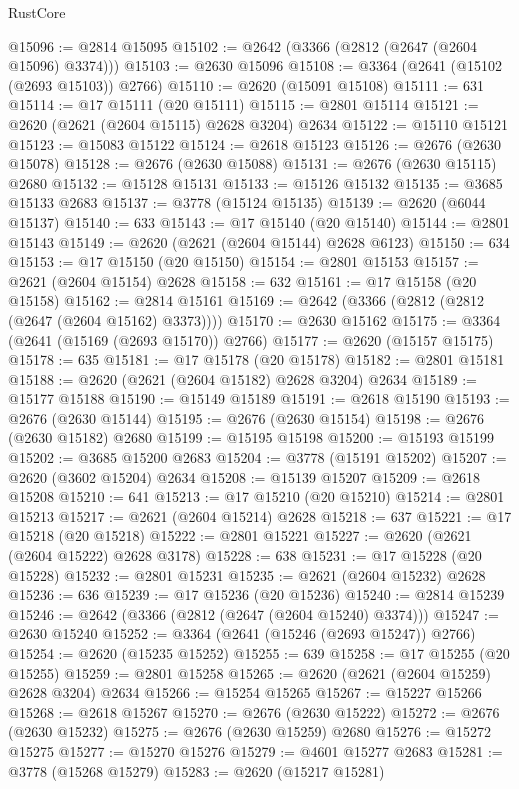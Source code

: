 \begin{lexlean}{RustCore}
\begin{coremodule}
@15096 := @2814 @15095
@15102 := @2642 (@3366 (@2812 (@2647 (@2604 @15096) @3374)))
@15103 := @2630 @15096
@15108 := @3364 (@2641 (@15102 (@2693 @15103)) @2766)
@15110 := @2620 (@15091 @15108)
@15111 := 631
@15114 := @17 @15111 (@20 @15111)
@15115 := @2801 @15114
@15121 := @2620 (@2621 (@2604 @15115) @2628 @3204) @2634
@15122 := @15110 @15121
@15123 := @15083 @15122
@15124 := @2618 @15123
@15126 := @2676 (@2630 @15078)
@15128 := @2676 (@2630 @15088)
@15131 := @2676 (@2630 @15115) @2680
@15132 := @15128 @15131
@15133 := @15126 @15132
@15135 := @3685 @15133 @2683
@15137 := @3778 (@15124 @15135)
@15139 := @2620 (@6044 @15137)
@15140 := 633
@15143 := @17 @15140 (@20 @15140)
@15144 := @2801 @15143
@15149 := @2620 (@2621 (@2604 @15144) @2628 @6123)
@15150 := 634
@15153 := @17 @15150 (@20 @15150)
@15154 := @2801 @15153
@15157 := @2621 (@2604 @15154) @2628
@15158 := 632
@15161 := @17 @15158 (@20 @15158)
@15162 := @2814 @15161
@15169 := @2642 (@3366 (@2812 (@2812 (@2647 (@2604 @15162) @3373))))
@15170 := @2630 @15162
@15175 := @3364 (@2641 (@15169 (@2693 @15170)) @2766)
@15177 := @2620 (@15157 @15175)
@15178 := 635
@15181 := @17 @15178 (@20 @15178)
@15182 := @2801 @15181
@15188 := @2620 (@2621 (@2604 @15182) @2628 @3204) @2634
@15189 := @15177 @15188
@15190 := @15149 @15189
@15191 := @2618 @15190
@15193 := @2676 (@2630 @15144)
@15195 := @2676 (@2630 @15154)
@15198 := @2676 (@2630 @15182) @2680
@15199 := @15195 @15198
@15200 := @15193 @15199
@15202 := @3685 @15200 @2683
@15204 := @3778 (@15191 @15202)
@15207 := @2620 (@3602 @15204) @2634
@15208 := @15139 @15207
@15209 := @2618 @15208
@15210 := 641
@15213 := @17 @15210 (@20 @15210)
@15214 := @2801 @15213
@15217 := @2621 (@2604 @15214) @2628
@15218 := 637
@15221 := @17 @15218 (@20 @15218)
@15222 := @2801 @15221
@15227 := @2620 (@2621 (@2604 @15222) @2628 @3178)
@15228 := 638
@15231 := @17 @15228 (@20 @15228)
@15232 := @2801 @15231
@15235 := @2621 (@2604 @15232) @2628
@15236 := 636
@15239 := @17 @15236 (@20 @15236)
@15240 := @2814 @15239
@15246 := @2642 (@3366 (@2812 (@2647 (@2604 @15240) @3374)))
@15247 := @2630 @15240
@15252 := @3364 (@2641 (@15246 (@2693 @15247)) @2766)
@15254 := @2620 (@15235 @15252)
@15255 := 639
@15258 := @17 @15255 (@20 @15255)
@15259 := @2801 @15258
@15265 := @2620 (@2621 (@2604 @15259) @2628 @3204) @2634
@15266 := @15254 @15265
@15267 := @15227 @15266
@15268 := @2618 @15267
@15270 := @2676 (@2630 @15222)
@15272 := @2676 (@2630 @15232)
@15275 := @2676 (@2630 @15259) @2680
@15276 := @15272 @15275
@15277 := @15270 @15276
@15279 := @4601 @15277 @2683
@15281 := @3778 (@15268 @15279)
@15283 := @2620 (@15217 @15281)

\end{coremodule}
\end{lexlean}
